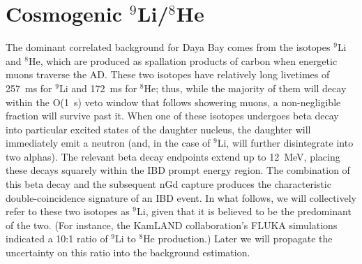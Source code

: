 \documentclass[../thesis.tex]{subfiles}
\begin{document}
\begin{comment}
As previously stated, the accidental background can be straightforwardly measured based on the characteristics of singles events. The singles spectrum is first measured by searching for prompt-like events that satisfy the usual muon vetos but are separated from other prompt-like events by at least 400~$\mu$s. The total integral of this spectrum gives the prompt-like rate $R_p$, while the integral above 6~MeV gives the delayed-like rate $R_d$. The accidental background rate is then simply
\[ R_\mathrm{acc} = R_d(1 - e^{-R_p\Delta t})e^{-2R_p\Delta t}, \] where the factor in parentheses is the probability for a prompt-like single to fall within the $\Delta t$~=~200~$\mu$s preceding a delayed-like single, and the final factor is the probability that the event is \emph{not} rejected by the decoupled multiplicity cut, which disallows any additional prompt-like single in the 400~$\mu$s preceding the delayed event. Once the rate has been determined this way, the spectrum is trivial: It is simply the singles spectrum itself.
\end{comment}

\begin{comment}
  Mention IHEP's cross-check, and the additional uncertainty stemming from the difference between it and the nominal result?
\end{comment}

\section{Cosmogenic $^9$Li/$^8$He}
\label{sec:bkgCosmo}

\newcommand\linine{$^9$Li}

The dominant correlated background for Daya Bay comes from the isotopes $^9$Li and $^8$He, which are produced as spallation products of carbon when energetic muons traverse the AD. These two isotopes have relatively long livetimes of 257~ms for $^9$Li and 172~ms for $^8$He; thus, while the majority of them will decay within the O(1~s) veto window that follows showering muons, a non-negligible fraction will survive past it. When one of these isotopes undergoes beta decay into particular excited states of the daughter nucleus, the daughter will immediately emit a neutron (and, in the case of $^9$Li, will further disintegrate into two alphas). The relevant beta decay endpoints extend up to 12~MeV, placing these decays squarely within the IBD prompt energy region. The combination of this beta decay and the subsequent nGd capture produces the characteristic double-coincidence signature of an IBD event. In what follows, we will collectively refer to these two isotopes as $^9$Li, given that it is believed to be the predominant of the two. (For instance, the KamLAND collaboration's FLUKA simulations \cite{KamLAND_cosmo} indicated a 10:1 ratio of $^9$Li to $^8$He production.) Later we will propagate the uncertainty on this ratio into the background estimation. 
\end{document}
